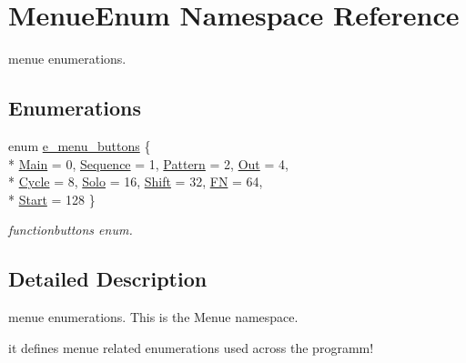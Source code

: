 \hypertarget{namespaceMenueEnum}{\section{Menue\-Enum Namespace Reference}
\label{namespaceMenueEnum}
}


menue enumerations.  


\subsection*{Enumerations}
\begin{DoxyCompactItemize}
\item 
enum \hyperlink{namespaceMenueEnum_aa57be3de8fc6dddef5122722fb84f135}{e\-\_\-menu\-\_\-buttons} \{ \\*
\hyperlink{namespaceMenueEnum_aa57be3de8fc6dddef5122722fb84f135ad4c7d33a612b599dc1a9a490a5476154}{Main} = 0, 
\hyperlink{namespaceMenueEnum_aa57be3de8fc6dddef5122722fb84f135a30d7bc3038f73142c5ad30eb4064337a}{Sequence} = 1, 
\hyperlink{namespaceMenueEnum_aa57be3de8fc6dddef5122722fb84f135ae3e17ded1a02c17f8dd854723c165c7a}{Pattern} = 2, 
\hyperlink{namespaceMenueEnum_aa57be3de8fc6dddef5122722fb84f135a20f5a7e9cf7f364f89812546d70067f8}{Out} = 4, 
\\*
\hyperlink{namespaceMenueEnum_aa57be3de8fc6dddef5122722fb84f135a98e800abaa8cee5559ae89f59430e3c5}{Cycle} = 8, 
\hyperlink{namespaceMenueEnum_aa57be3de8fc6dddef5122722fb84f135abcfb623100a46065d3117b44229c6e4a}{Solo} = 16, 
\hyperlink{namespaceMenueEnum_aa57be3de8fc6dddef5122722fb84f135a9f1a9a550daaa44670e944d0753ff593}{Shift} = 32, 
\hyperlink{namespaceMenueEnum_aa57be3de8fc6dddef5122722fb84f135aeebc90c2e8bfcacbac591260c9672077}{F\-N} = 64, 
\\*
\hyperlink{namespaceMenueEnum_aa57be3de8fc6dddef5122722fb84f135ac55b97e6a6bb74d8ffd6aa5e3ef0f927}{Start} = 128
 \}
\begin{DoxyCompactList}\small\item\em functionbuttons enum. \end{DoxyCompactList}\end{DoxyCompactItemize}


\subsection{Detailed Description}
menue enumerations. This is the Menue namespace.\par
 it defines menue related enumerations used across the programm! 

